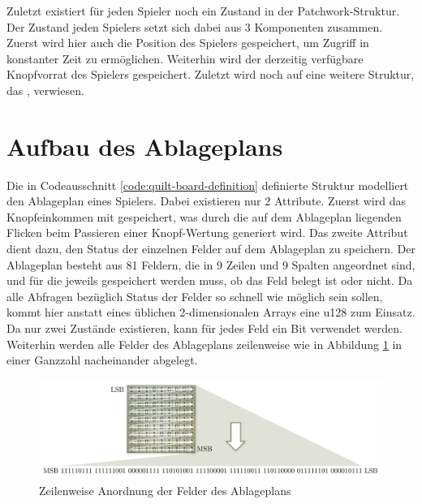 Zuletzt existiert für jeden Spieler noch ein Zustand in der Patchwork-Struktur. Der Zustand jeden Spielers setzt sich dabei aus 3 Komponenten zusammen. Zuerst wird hier auch die Position des Spielers gespeichert, um Zugriff in konstanter Zeit zu ermöglichen. Weiterhin wird der derzeitig verfügbare Knopfvorrat des Spielers gespeichert. Zuletzt wird noch auf eine weitere Struktur, das , verwiesen.

\section{Aufbau des Ablageplans}


\vspace*{-0.3cm}

Die in Codeausschnitt \ref{code:quilt-board-definition} definierte Struktur  modelliert den Ablageplan eines Spielers. Dabei existieren nur 2 Attribute. Zuerst wird das Knopfeinkommen mit  gespeichert, was durch die auf dem Ablageplan liegenden Flicken beim Passieren einer Knopf-Wertung generiert wird. Das zweite Attribut  dient dazu, den Status der einzelnen Felder auf dem Ablageplan zu speichern. Der Ablageplan besteht aus 81 Feldern, die in 9 Zeilen und 9 Spalten angeordnet sind, und für die jeweils gespeichert werden muss, ob das Feld belegt ist oder nicht. Da alle Abfragen bezüglich Status der Felder so schnell wie möglich sein sollen, kommt hier anstatt eines üblichen 2-dimensionalen Arrays eine \ac{u128} zum Einsatz. Da nur zwei Zustände existieren, kann für jedes Feld ein Bit verwendet werden. Weiterhin werden alle Felder des Ablageplans zeilenweise wie in Abbildung \ref{fig:quilt-board-storage} in einer Ganzzahl nacheinander abgelegt.

\vspace*{-5cm}
\pagebreak

\vspace*{0.5cm}

\begin{figure}[!ht]
    \centering
     \vspace*{-\baselineskip}
    \includegraphics[width=\textwidth]{res/pictures/quilt-board-storage.pdf}
    \caption{Zeilenweise Anordnung der Felder des Ablageplans}
    \label{fig:quilt-board-storage}
\end{figure}

